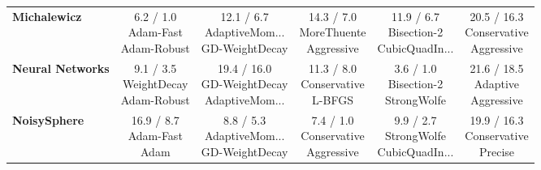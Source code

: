\documentclass{article}
\begin{document}
\begin{longtable}{lccccc}
\textbf{Michalewicz} & \cellcolor{green!20} \makecell{6.2 / 1.0 \\ \scriptsize{Adam-Fast} \\ \scriptsize{Adam-Robust}}&  \makecell{12.1 / 6.7 \\ \scriptsize{AdaptiveMom...} \\ \scriptsize{GD-WeightDecay}}&  \makecell{14.3 / 7.0 \\ \scriptsize{MoreThuente} \\ \scriptsize{Aggressive}}&  \makecell{11.9 / 6.7 \\ \scriptsize{Bisection-2} \\ \scriptsize{CubicQuadIn...}}& \cellcolor{red!15} \makecell{20.5 / 16.3 \\ \scriptsize{Conservative} \\ \scriptsize{Aggressive}} \\
\textbf{Neural Networks} &  \makecell{9.1 / 3.5 \\ \scriptsize{WeightDecay} \\ \scriptsize{Adam-Robust}}&  \makecell{19.4 / 16.0 \\ \scriptsize{GD-WeightDecay} \\ \scriptsize{AdaptiveMom...}}&  \makecell{11.3 / 8.0 \\ \scriptsize{Conservative} \\ \scriptsize{L-BFGS}}& \cellcolor{green!20} \makecell{3.6 / 1.0 \\ \scriptsize{Bisection-2} \\ \scriptsize{StrongWolfe}}& \cellcolor{red!15} \makecell{21.6 / 18.5 \\ \scriptsize{Adaptive} \\ \scriptsize{Aggressive}} \\
\textbf{NoisySphere} &  \makecell{16.9 / 8.7 \\ \scriptsize{Adam-Fast} \\ \scriptsize{Adam}}&  \makecell{8.8 / 5.3 \\ \scriptsize{AdaptiveMom...} \\ \scriptsize{GD-WeightDecay}}& \cellcolor{green!20} \makecell{7.4 / 1.0 \\ \scriptsize{Conservative} \\ \scriptsize{Aggressive}}&  \makecell{9.9 / 2.7 \\ \scriptsize{StrongWolfe} \\ \scriptsize{CubicQuadIn...}}& \cellcolor{red!15} \makecell{19.9 / 16.3 \\ \scriptsize{Conservative} \\ \scriptsize{Precise}} \\

\end{longtable}
\end{document}
